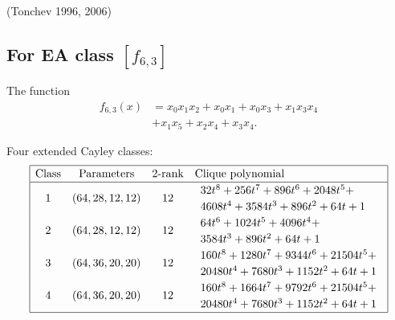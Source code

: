 \documentclass[12pt,a4paper]{article}
\newcommand{\slidecite}[1]{\tiny{(#1)}\normalsize{}}
\begin{document}
\slidecite{Tonchev 1996, 2006}
\subsection*{For EA class $[f_{6,3}]$}

The function
\begin{align*}
f_{6,3}(x) &= x_{0} x_{1} x_{2} + x_{0} x_{1} + x_{0} x_{3} + x_{1} x_{3} x_{4} 
\\
           &+ x_{1} x_{5} + x_{2} x_{4} + x_{3} x_{4}.
\end{align*}

Four extended Cayley classes:
\small{}
\begin{align*}
\def\arraystretch{1.2}
\begin{array}{|cccl|}
\hline
\text{Class} &
\text{Parameters} & 
\text{2-rank} &
\text{Clique polynomial}
\\
\hline
1 &
(64, 28, 12, 12) & 12 & 
\begin{array}{l}
32t^{8} + 256t^{7} + 896t^{6} + 2048t^{5} +
\\
4608t^{4} + 3584t^{3} + 896t^{2} + 64t + 1
\end{array}
\\
2 &
(64, 28, 12, 12) & 12 & 
\begin{array}{l}
64t^{6} + 1024t^{5} + 4096t^{4} + 
\\
3584t^{3} + 896t^{2} + 64t + 1
\end{array}
\\
3 &
(64, 36, 20, 20) & 12 & 
\begin{array}{l}
160t^{8} + 1280t^{7} + 9344t^{6} + 21504t^{5} +
\\
20480t^{4} + 7680t^{3} + 1152t^{2} + 64t + 1
\end{array}
\\
4 &
(64, 36, 20, 20) & 12 & 
\begin{array}{l}
160t^{8} + 1664t^{7} + 9792t^{6} + 21504t^{5} +
\\
20480t^{4} + 7680t^{3} + 1152t^{2} + 64t + 1
\end{array}
\\
\hline
\end{array}
\end{align*}
\end{document}
